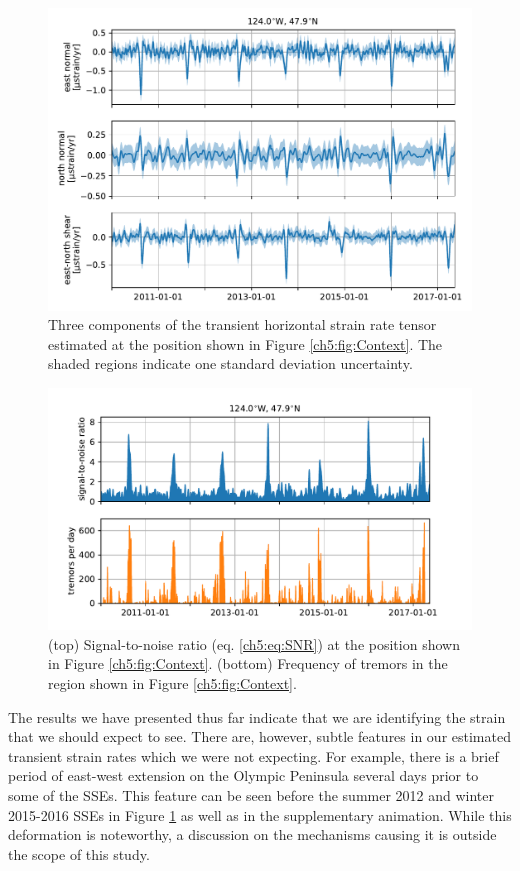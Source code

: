 \begin{figure}
\includegraphics{ch5/figures/strain_ts/strain-ts.pdf}
\caption{Three components of the transient horizontal strain rate
tensor estimated at the position shown in Figure
\ref{ch5:fig:Context}. The shaded regions indicate one standard
deviation uncertainty.}
\label{ch5:fig:StrainTs}
\end{figure}

\begin{figure}
\includegraphics{ch5/figures/strain_ts/mag-ts.pdf}
\caption{(top) Signal-to-noise ratio (eq. \ref{ch5:eq:SNR}) at the
position shown in Figure \ref{ch5:fig:Context}. (bottom) Frequency of
tremors in the region shown in Figure \ref{ch5:fig:Context}.}
\label{ch5:fig:StrainMag}
\end{figure}

The results we have presented thus far indicate that we are
identifying the strain that we should expect to see. There are,
however, subtle features in our estimated transient strain rates which
we were not expecting. For example, there is a brief period of
east-west extension on the Olympic Peninsula several days prior to
some of the SSEs. This feature can be seen before the summer 2012 and
winter 2015-2016 SSEs in Figure \ref{ch5:fig:StrainTs} as well as in
the supplementary animation. While this deformation is noteworthy, a
discussion on the mechanisms causing it is outside the scope of this
study.

